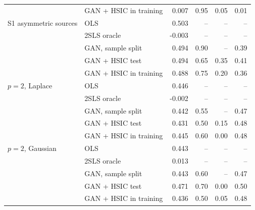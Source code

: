 \begin{table}[ht]
\begin{tabular}{@{}llrrrr@{}}
 & GAN + HSIC in training & 0.007 & 0.95 & 0.05 & 0.01 \\
\addlinespace
S1 asymmetric sources & OLS & 0.503 & -- & -- & -- \\
 & 2SLS oracle & -0.003 & -- & -- & -- \\
 & GAN, sample split & 0.494 & 0.90 & -- & 0.39 \\
 & GAN + HSIC test & 0.494 & 0.65 & 0.35 & 0.41 \\
 & GAN + HSIC in training & 0.488 & 0.75 & 0.20 & 0.36 \\
\addlinespace
$p=2$, Laplace & OLS & 0.446 & -- & -- & -- \\
 & 2SLS oracle & -0.002 & -- & -- & -- \\
 & GAN, sample split & 0.442 & 0.55 & -- & 0.47 \\
 & GAN + HSIC test & 0.431 & 0.50 & 0.15 & 0.48 \\
 & GAN + HSIC in training & 0.445 & 0.60 & 0.00 & 0.48 \\
\addlinespace
$p=2$, Gaussian & OLS & 0.443 & -- & -- & -- \\
 & 2SLS oracle & 0.013 & -- & -- & -- \\
 & GAN, sample split & 0.443 & 0.60 & -- & 0.47 \\
 & GAN + HSIC test & 0.471 & 0.70 & 0.00 & 0.50 \\
 & GAN + HSIC in training & 0.436 & 0.50 & 0.05 & 0.48 \\
\bottomrule
\end{tabular}
\end{table}
